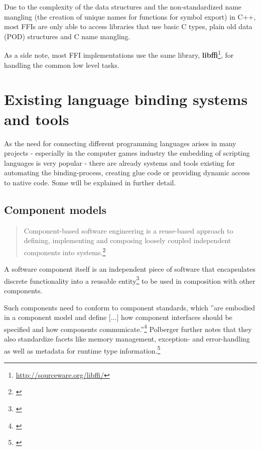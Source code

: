 Due to the complexity of the data structures and the non-standardized name mangling (the creation of unique names for functions for symbol export) in C++, most FFIs are only able to access libraries that use basic C types, plain old data (POD) structures and C name mangling.

As a side note, most FFI implementations use the same library, \textbf{libffi}\footnote{\url{http://sourceware.org/libffi/}}, for handling the common low level tasks.


\section{Existing language binding systems and tools}

As the need for connecting different programming languages arises in many projects - especially in the computer games industry the embedding of scripting languages is very popular - there are already systems and tools existing for automating the binding-process, creating glue code or providing dynamic access to native code. Some will be explained in further detail.

\subsection{Component models}

\begin{quotation}
Component-based software engineering is a reuse-based approach to defining, implementing and composing loosely coupled independent components into systems.\footnote{\citep[460]{Sommerville}}
\end{quotation}

A software component itself is an independent piece of software that encapsulates discrete functionality into a reusable entity\footnote{\citep[3]{ComponentTechnology}} to be used in composition with other components.

Such components need to conform to component standards, which ''are embodied in a component model and define [...] how component interfaces should be specified and how components communicate.''\footnote{\citep[440]{Sommerville}} Polberger further notes that they also standardize facets like memory management, exception- and error-handling as well as metadata for runtime type information.\footnote{\citep[8]{ComponentTechnology}}

